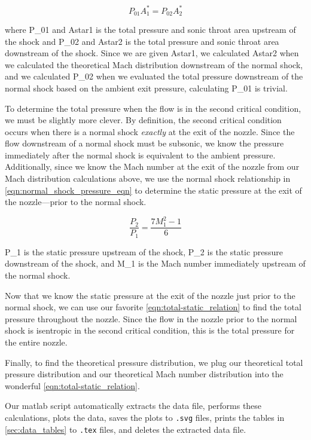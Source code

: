 \begin{equation} \label{eqn:shock_in_nozzle}
    P_{01}A_1^* = P_{02}A_2^*
\end{equation}

\noindent{}where \gls{P_01} and \gls{Astar1} is the total pressure and sonic throat area upstream of the shock and \gls{P_02} and \gls{Astar2} is the total pressure and sonic throat area downstream of the shock. Since we are given \gls{Astar1}, we calculated \gls{Astar2} when we calculated the theoretical Mach distribution downstream of the normal shock, and we calculated \gls{P_02} when we evaluated the total pressure downstream of the normal shock based on the ambient exit pressure, calculating \gls{P_01} is trivial.

To determine the total pressure when the flow is in the second critical condition, we must be slightly more clever. By definition, the second critical condition occurs when there is a normal shock \textit{exactly} at the exit of the nozzle. Since the flow downstream of a normal shock must be subsonic, we know the pressure immediately after the normal shock is equivalent to the ambient pressure. Additionally, since we know the Mach number at the exit of the nozzle from our Mach distribution calculations above, we use the normal shock relationship in \autoref{eqn:normal_shock_pressure_eqn} to determine the static pressure at the exit of the nozzle—prior to the normal shock.

\begin{equation} \label{eqn:normal_shock_pressure_eqn}
    \frac{P_2}{P_1} = \frac{7M_1^2 - 1}{6}
\end{equation}

\noindent{}\gls{P_1} is the static pressure upstream of the shock, \gls{P_2} is the static pressure downstream of the shock, and \gls{M_1} is the Mach number immediately upstream of the normal shock.

Now that we know the static pressure at the exit of the nozzle just prior to the normal shock, we can use our favorite \autoref{eqn:total-static_relation} to find the total pressure throughout the nozzle. Since the flow in the nozzle prior to the normal shock is isentropic in the second critical condition, this is the total pressure for the entire nozzle.

Finally, to find the theoretical pressure distribution, we plug our theoretical total pressure distribution and our theoretical Mach number distribution into the wonderful \autoref{eqn:total-static_relation}.

Our \acrshort{matlab} script automatically extracts the data file, performs these calculations, plots the data, saves the plots to \verb|.svg| files, prints the tables in \autoref{sec:data_tables} to \verb|.tex| files, and deletes the extracted data file.